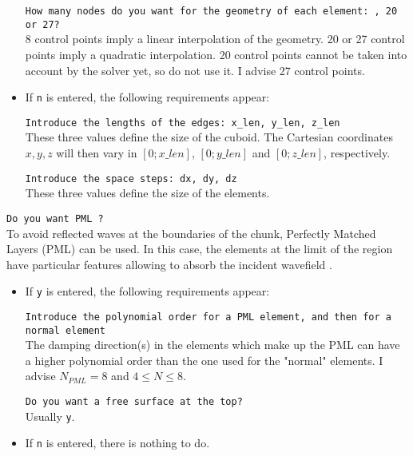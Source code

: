 \begin{itemize}[topsep=2pt,itemsep=4pt]
\texttt{How many nodes do you want for the geometry of each element: , 20 or 27?}\\
8 control points imply a linear interpolation of the geometry. 20 or 27 control points imply a quadratic interpolation. 20 control points cannot be taken into account by the solver yet, so do not use it. I advise 27 control points.

\item If \texttt{n} is entered, the following requirements appear:
\parskip 10pt

\texttt{Introduce the lengths of the edges: x\_len, y\_len, z\_len}\\
These three values define the size of the cuboid. The Cartesian coordinates $x,y,z$ will then vary in $[0;x\_len]$, $[0;y\_len]$ and $[0;z\_len]$, respectively.

\texttt{Introduce the space steps: dx, dy, dz}\\
These three values define the size of the elements.

\end{itemize}

\texttt{Do you want PML ?}\\
To avoid reflected waves at the boundaries of the chunk, Perfectly Matched Layers (PML) can be used. In this case, the elements at the limit of the region have particular features allowing to absorb the incident wavefield .

\begin{itemize}[topsep=2pt,itemsep=4pt]

\item If \texttt{y} is entered, the following requirements appear:
\parskip 10pt

\texttt{Introduce the polynomial order for a PML element, and then \linebreak
for a normal element}\\
The damping direction(s) in the elements which make up the PML can have a higher polynomial order than the one used for the "normal" elements. I advise $N_{PML} = 8$ and $4 \le N \le 8$.

\texttt{Do you want a free surface at the top?}\\
Usually \texttt{y}.

\item If \texttt{n} is entered, there is nothing to do.

\end{itemize}

